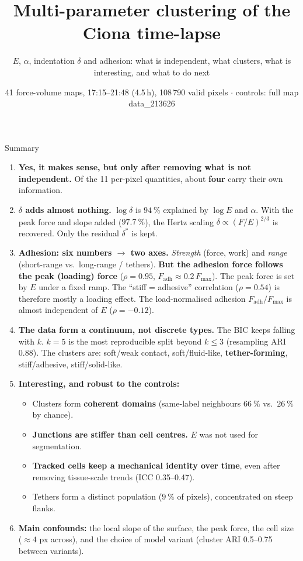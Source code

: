 \documentclass[aspectratio=169,9pt]{beamer}
\title{Multi-parameter clustering of the Ciona time-lapse}
\subtitle{$E$, $\alpha$, indentation $\delta$ and adhesion: what is independent, what clusters, what is interesting, and what to do next}
\date{41 force-volume maps, 17:15--21:48 (4.5\,h), 108\,790 valid pixels $\cdot$ controls: full map data\_213626}
\author{}
\begin{document}
\maketitle

\begin{frame}{Summary}
\scriptsize
\begin{enumerate}
\item \textbf{Yes, it makes sense, but only after removing what is not independent.} Of the 11 per-pixel quantities, about \textbf{four} carry their own information.
\item \textbf{$\delta$ adds almost nothing.} $\log\delta$ is $\SI{94}{\percent}$ explained by $\log E$ and $\alpha$. With the peak force and slope added ($\SI{97.7}{\percent}$), the Hertz scaling $\delta\propto(F/E)^{2/3}$ is recovered. Only the residual $\delta^*$ is kept.
\item \textbf{Adhesion: six numbers $\to$ two axes.} \emph{Strength} (force, work) and \emph{range} (short-range vs.\ long-range / tethers). \textcolor{cRed}{\textbf{But the adhesion force follows the peak (loading) force}} ($\rho=0.95$, $F_\mathrm{adh}\approx0.2\,F_\max$). The peak force is set by $E$ under a fixed ramp. The ``stiff = adhesive'' correlation ($\rho=0.54$) is therefore mostly a loading effect. The load-normalised adhesion $F_\mathrm{adh}/F_\max$ is almost independent of $E$ ($\rho=-0.12$).
\item \textbf{The data form a continuum, not discrete types.} The BIC keeps falling with $k$. $k=5$ is the most reproducible split beyond $k\le3$ (resampling ARI 0.88). The clusters are: soft/weak contact, soft/fluid-like, \textbf{tether-forming}, stiff/adhesive, stiff/solid-like.
\item \textbf{Interesting, and robust to the controls:}
\begin{itemize}\footnotesize
\item Clusters form \textbf{coherent domains} (same-label neighbours $\SI{66}{\percent}$ vs.\ $\SI{26}{\percent}$ by chance).
\item \textbf{Junctions are stiffer than cell centres.} $E$ was not used for segmentation.
\item \textbf{Tracked cells keep a mechanical identity over time}, even after removing tissue-scale trends (ICC 0.35--0.47).
\item Tethers form a distinct population ($\SI{9}{\percent}$ of pixels), concentrated on steep flanks.
\end{itemize}
\item \textbf{Main confounds:} the local slope of the surface, the peak force, the cell size ($\approx4$ px across), and the choice of model variant (cluster ARI 0.5--0.75 between variants).

\end{enumerate}
\end{frame}
\end{document}

